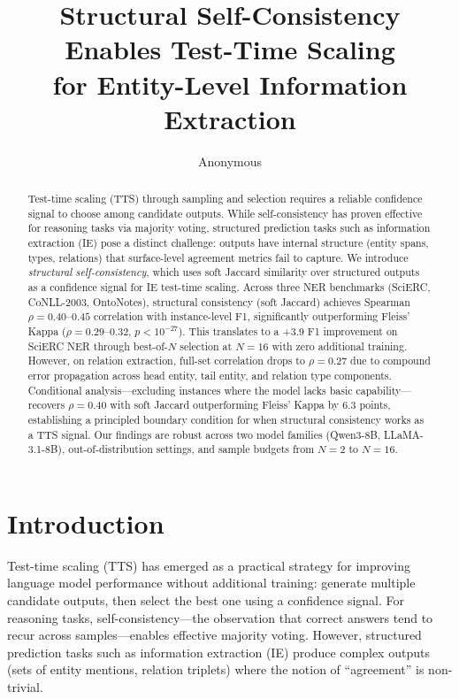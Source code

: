 \documentclass[11pt,a4paper]{article}
\title{Structural Self-Consistency Enables Test-Time Scaling\\for Entity-Level Information Extraction}
\author{Anonymous}
\date{}
\begin{document}
\maketitle

\begin{abstract}
Test-time scaling (TTS) through sampling and selection requires a reliable confidence signal to choose among candidate outputs. While self-consistency has proven effective for reasoning tasks via majority voting, structured prediction tasks such as information extraction (IE) pose a distinct challenge: outputs have internal structure (entity spans, types, relations) that surface-level agreement metrics fail to capture. We introduce \emph{structural self-consistency}, which uses soft Jaccard similarity over structured outputs as a confidence signal for IE test-time scaling.
Across three NER benchmarks (SciERC, CoNLL-2003, OntoNotes), structural consistency (soft Jaccard) achieves Spearman $\rho\!=\!0.40$--$0.45$ correlation with instance-level F1, significantly outperforming Fleiss' Kappa ($\rho\!=\!0.29$--$0.32$, $p\!<\!10^{-27}$). This translates to a +3.9 F1 improvement on SciERC NER through best-of-$N$ selection at $N\!=\!16$ with zero additional training. However, on relation extraction, full-set correlation drops to $\rho\!=\!0.27$ due to compound error propagation across head entity, tail entity, and relation type components. Conditional analysis---excluding instances where the model lacks basic capability---recovers $\rho\!=\!0.40$ with soft Jaccard outperforming Fleiss' Kappa by 6.3 points, establishing a principled boundary condition for when structural consistency works as a TTS signal. Our findings are robust across two model families (Qwen3-8B, LLaMA-3.1-8B), out-of-distribution settings, and sample budgets from $N\!=\!2$ to $N\!=\!16$.
\end{abstract}

\section{Introduction}

Test-time scaling (TTS) has emerged as a practical strategy for improving language model performance without additional training: generate multiple candidate outputs, then select the best one using a confidence signal. For reasoning tasks, self-consistency---the observation that correct answers tend to recur across samples---enables effective majority voting. However, structured prediction tasks such as information extraction (IE) produce complex outputs (sets of entity mentions, relation triplets) where the notion of ``agreement'' is non-trivial.
\end{document}
